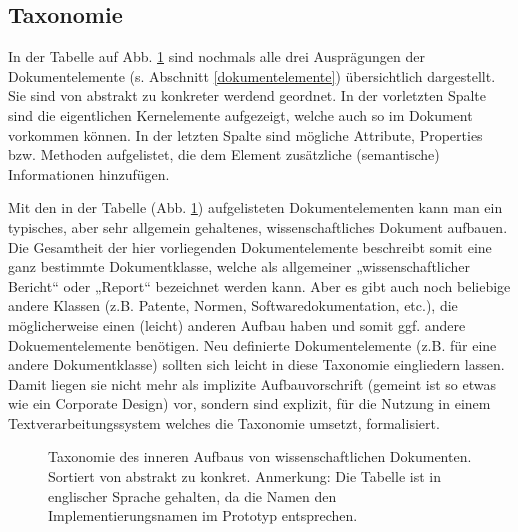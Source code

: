  
\subsection{Taxonomie}\label{taxonomiesec}
 
In der Tabelle auf Abb. \ref{taxonomie} sind nochmals alle drei Ausprägungen der Dokumentelemente (s. Abschnitt \ref{dokumentelemente}) übersichtlich dargestellt. Sie sind von abstrakt zu konkreter werdend geordnet. In der vorletzten Spalte sind die eigentlichen Kernelemente aufgezeigt, welche auch so im Dokument vorkommen können. In der letzten Spalte sind mögliche Attribute, Properties bzw. Methoden aufgelistet, die dem Element zusätzliche (semantische) Informationen hinzufügen.

 
Mit den in der Tabelle (Abb. \ref{taxonomie}) aufgelisteten Dokumentelementen kann man ein typisches, aber sehr allgemein gehaltenes, wissenschaftliches Dokument aufbauen. Die Gesamtheit der hier vorliegenden Dokumentelemente beschreibt somit eine ganz bestimmte Dokumentklasse, welche als allgemeiner „wissenschaftlicher Bericht“ oder „Report“ bezeichnet werden kann. Aber es gibt auch noch beliebige andere Klassen (z.B. Patente, Normen, Softwaredokumentation, etc.), die möglicherweise einen (leicht) anderen Aufbau haben und somit ggf. andere Dokuementelemente benötigen. Neu definierte Dokumentelemente (z.B. für eine andere Dokumentklasse) sollten sich leicht in diese Taxonomie eingliedern lassen. Damit liegen sie nicht mehr als implizite Aufbauvorschrift (gemeint ist so etwas wie ein Corporate Design) vor, sondern sind explizit, für die Nutzung in einem Textverarbeitungssystem welches die Taxonomie umsetzt, formalisiert.

 
\begin{figure}[h!]
\centering
\advance\leftskip-2.5cm
\caption[Taxonomie über den inneren Dokumentenaufbau]{ Taxonomie des inneren Aufbaus von wissenschaftlichen Dokumenten. Sortiert von abstrakt zu konkret. Anmerkung: Die Tabelle ist in englischer Sprache gehalten, da die Namen den Implementierungsnamen im Prototyp entsprechen. }\label{taxonomie}
\end{figure}
 
